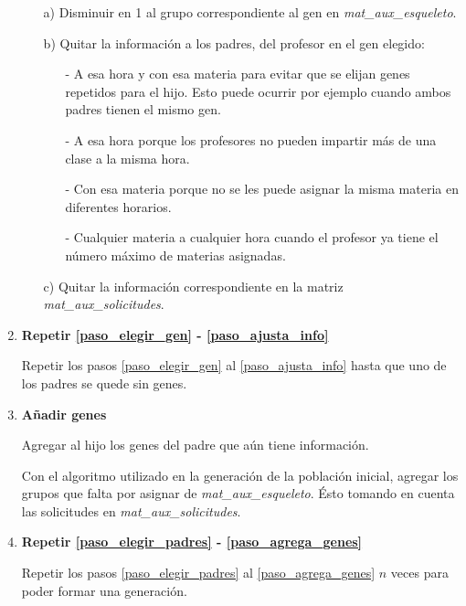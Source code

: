 \begin{enumerate}
\begin{itemize}
\item[a)] Disminuir en 1 al grupo correspondiente al gen en \textit{mat\_aux\_esqueleto}.

\item[b)] Quitar la información a los padres, del profesor en el gen elegido:

\begin{itemize}
\item[-] A esa hora y con esa materia para evitar que se elijan genes repetidos para el hijo. Esto puede ocurrir por ejemplo cuando ambos padres tienen el mismo gen.

\item[-] A esa hora porque los profesores no pueden impartir más de una clase a la misma hora.

\item[-] Con esa materia porque no se les puede asignar la misma materia en diferentes horarios.

\item[-] Cualquier materia a cualquier hora cuando el profesor ya tiene el número máximo de materias asignadas.
\end{itemize}

\item[c)] Quitar la información correspondiente en la matriz \textit{mat\_aux\_solicitudes}.
\end{itemize}

\item \textbf{Repetir \ref{paso_elegir_gen} - \ref{paso_ajusta_info}}

Repetir los pasos \ref{paso_elegir_gen} al \ref{paso_ajusta_info} hasta que uno de los padres se quede sin genes.

\item \textbf{Añadir genes} \label{paso_agrega_genes}

Agregar al hijo los genes del padre que aún tiene información.

Con el algoritmo utilizado en la generación de la población inicial, agregar los grupos que falta por asignar de \textit{mat\_aux\_esqueleto}. Ésto tomando en cuenta las solicitudes en \textit{mat\_aux\_solicitudes}.

\item \textbf{Repetir \ref{paso_elegir_padres} - \ref{paso_agrega_genes}}

Repetir los pasos \ref{paso_elegir_padres} al \ref{paso_agrega_genes} $n$ veces para poder formar una generación.


\end{enumerate}
